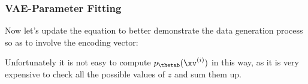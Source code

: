 
\begin{frame}
\frametitle{VAE-Parameter Fitting}
\vspace{2mm}

Now let's update the equation to better demonstrate the data generation process so as to involve the encoding vector:

\vspace{2mm}

\vspace{2mm}

Unfortunately it is not easy to compute $ p_{\thetab} (\xv^{(i)}) $ in this way, as it is very expensive to check all the possible values of $z$ and sum them up.
\end{frame}



